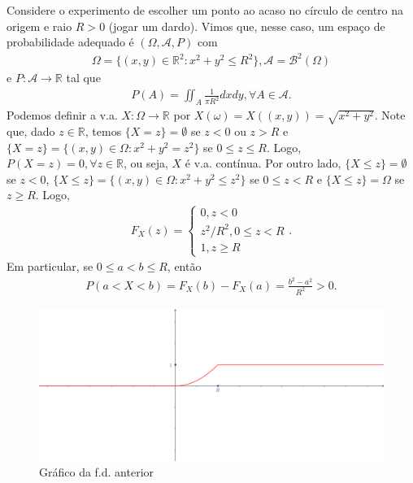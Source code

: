 \documentclass[../Notas.tex]{subfiles}
\begin{document}
\begin{example}
Considere o experimento de escolher um ponto ao acaso no círculo de centro na origem e raio $R>0$ (jogar um dardo). Vimos que, nesse caso, um espaço de probabilidade adequado é $(\Omega, \mathcal{A}, P)$ com
\begin{align*}
    \Omega = \{ (x,y)\in\mathbb{R}^2 : x^2+y^2\leq R^2 \}, \mathcal{A} = \mathcal{B}^2(\Omega)
\end{align*}
e $P:\mathcal{A}\to\mathbb{R}$ tal que
\begin{align*}
    P(A) = \iint_A \frac{1}{\pi R^2}dxdy, \forall A\in\mathcal{A}.
\end{align*}
Podemos definir a v.a. $X:\Omega\to\mathbb{R}$ por $X(\omega) = X((x,y)) = \sqrt{x^2+y^2}$. Note que, dado $z\in\mathbb{R}$, temos $\{X = z\} = \emptyset$ se $z < 0$ ou $z>R$ e $\{ X=z \} = \{ (x,y)\in\Omega : x^2+y^2 = z^2 \}$ se $0\leq z \leq R$. Logo, $P(X=z) = 0, \forall z\in\mathbb{R}$, ou seja, $X$ é v.a. contínua. Por outro lado, $\{X\leq z\} = \emptyset$ se $z<0$, $\{X\leq z\} = \{ (x,y)\in\Omega : x^2+y^2 \leq z^2 \}$ se $0\leq z < R$ e $\{X\leq z\} = \Omega$ se $z\geq R$. Logo,
\begin{align*}
    F_X(z) = \begin{cases}
    0, z < 0 \\
    z^2/R^2, 0\leq z < R \\
    1, z\geq R
    \end{cases}.
\end{align*}
Em particular, se $0\leq a < b\leq R$, então
\begin{align*}
    P(a < X < b) = F_X(b) - F_X(a) = \frac{b^2 - a^2}{R^2} > 0.
\end{align*}
\begin{figure}[H]
    \centering
    \includegraphics[width=\textwidth]{Imagens/p104.png}
    \caption{Gráfico da f.d. anterior}
\end{figure}
\end{example}
\end{document}
